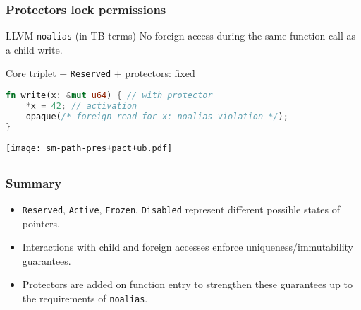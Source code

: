 \begin{frame}[fragile]
    \frametitle{Protectors lock permissions}
    \begin{alertblock}{LLVM \texttt{noalias} (in TB terms)}
        No foreign access during the same function call as a child write.
    \end{alertblock}

    \begin{block}{Core triplet + \texttt{Reserved} + protectors: fixed}
        \begin{lstlisting}[language=rust, escapechar=@]
fn write(x: &mut u64) { // with protector
    *x = 42; // activation
    opaque(/* foreign read for x: noalias violation */);
}
        \end{lstlisting}
    \end{block}
    \texttt{[image: sm-path-pres+pact+ub.pdf]}
\end{frame}

\subsection*{}

\begin{frame}
    \frametitle{Summary}
    \begin{itemize}
        \item \texttt{Reserved}, \texttt{Active}, \texttt{Frozen}, \texttt{Disabled}
            represent different possible states of pointers.\\
        \item Interactions with child and foreign accesses enforce uniqueness/immutability guarantees.
        \item Protectors are added on function entry to strengthen these guarantees up to the
            requirements of \texttt{noalias}.\\
    \end{itemize}
\end{frame}
